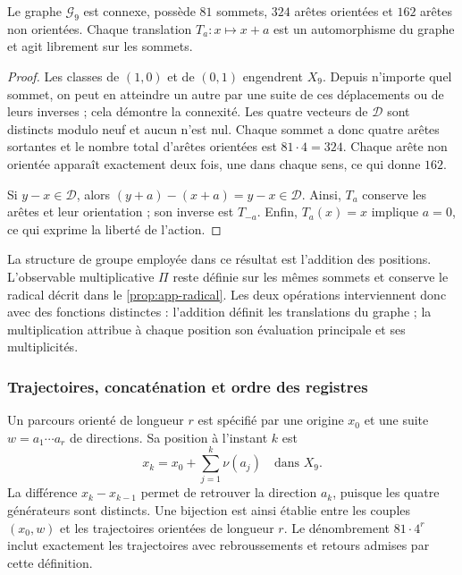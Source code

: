 \begin{proposicion}
\label{geo:prop-cayley}
Le graphe $\mathscr G_9$ est connexe, possède $81$ sommets, $324$ arêtes orientées et $162$ arêtes non orientées. Chaque translation $T_a:x\mapsto x+a$ est un automorphisme du graphe et agit librement sur les sommets.
\end{proposicion}

\begin{proof}
Les classes de $(1,0)$ et de $(0,1)$ engendrent $X_9$. Depuis n'importe quel sommet, on peut en atteindre un autre par une suite de ces déplacements ou de leurs inverses ; cela démontre la connexité. Les quatre vecteurs de $\mathscr D$ sont distincts modulo neuf et aucun n'est nul. Chaque sommet a donc quatre arêtes sortantes et le nombre total d'arêtes orientées est $81\cdot4=324$. Chaque arête non orientée apparaît exactement deux fois, une dans chaque sens, ce qui donne $162$.

Si $y-x\in\mathscr D$, alors $(y+a)-(x+a)=y-x\in\mathscr D$. Ainsi, $T_a$ conserve les arêtes et leur orientation ; son inverse est $T_{-a}$. Enfin, $T_a(x)=x$ implique $a=0$, ce qui exprime la liberté de l'action.
\end{proof}

La structure de groupe employée dans ce résultat est l'addition des positions. L'observable multiplicative $\Pi$ reste définie sur les mêmes sommets et conserve le radical décrit dans le \cref{prop:app-radical}. Les deux opérations interviennent donc avec des fonctions distinctes : l'addition définit les translations du graphe ; la multiplication attribue à chaque position son évaluation principale et ses multiplicités.

\subsubsection{Trajectoires, concaténation et ordre des registres}

Un parcours orienté de longueur $r$ est spécifié par une origine $x_0$ et une suite $w=a_1\cdots a_r$ de directions. Sa position à l'instant $k$ est
\[
 x_k=x_0+\sum_{j=1}^{k}\nu(a_j)\quad\text{dans }X_9.
\]
La différence $x_k-x_{k-1}$ permet de retrouver la direction $a_k$, puisque les quatre générateurs sont distincts. Une bijection est ainsi établie entre les couples $(x_0,w)$ et les trajectoires orientées de longueur $r$. Le dénombrement $81\cdot4^r$ inclut exactement les trajectoires avec rebroussements et retours admises par cette définition.

